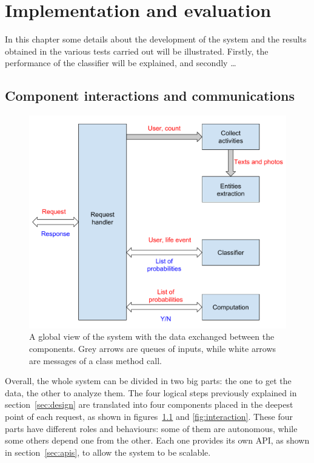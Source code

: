 \chapter{Implementation and evaluation}
\label{cha:results}
In this chapter some details about the development of the system and the results obtained in the various tests carried out will be illustrated. Firstly, the performance of the classifier will be explained, and secondly \dots

\section{Component interactions and communications}
\label{sec:view}
\begin{figure}
\centering
\includegraphics[width=%
1.0\textwidth]{img/Globalview}
\caption{A global view of the system with the data exchanged between the components. Grey arrows are queues of inputs, while white arrows are messages of a class method call.}
\label{fig:globalview}
\end{figure}

Overall, the whole system can be divided in two big parts: the one to get the data, the other to analyze them. The four logical steps previously explained in section~\ref{sec:design} are translated into four components placed in the deepest point of each request, as shown in figures~\ref{fig:globalview} and \ref{fig:interaction}. These four parts have different roles and behaviours: some of them are autonomous, while some others depend one from the other. Each one provides its own API, as shown in section~\ref{sec:apis}, to allow the system to be scalable.

